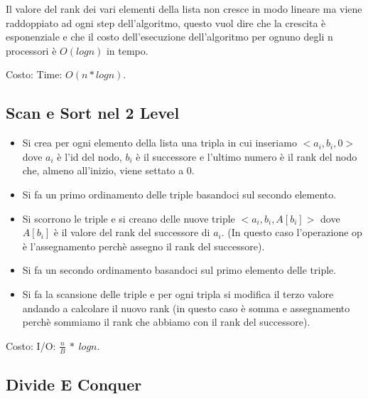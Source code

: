 \documentclass[12pt]{article}
\begin{document}
Il valore del rank dei vari elementi della lista non cresce in modo lineare ma viene raddoppiato ad ogni step dell'algoritmo, questo vuol dire che la crescita è esponenziale e che il costo dell'esecuzione dell'algoritmo per ognuno degli n processori è $O(logn)$ in tempo. 

Costo: Time: $O(n*logn)$.

\subsection{Scan e Sort nel 2 Level}

\begin{itemize}
    \item Si crea per ogni elemento della lista una tripla in cui inseriamo $<a_i, b_i, 0>$ dove $a_i$ è l'id del nodo, $b_i$ è il successore e l'ultimo numero è il rank del nodo che, almeno all'inizio, viene settato a 0.
    \item Si fa un primo ordinamento delle triple basandoci sul secondo elemento.
    \item Si scorrono le triple e si creano delle nuove triple $<a_i, b_i, A[b_i]>$ dove $A[b_i]$ è il valore del rank del successore di $a_i$. (In questo caso l'operazione op è l'assegnamento perchè assegno il rank del successore).
    \item Si fa un secondo ordinamento basandoci sul primo elemento delle triple.
    \item Si fa la scansione delle triple e per ogni tripla si modifica il terzo valore andando a calcolare il nuovo rank (in questo caso è somma e assegnamento perchè sommiamo il rank che abbiamo con il rank del successore).
\end{itemize}

Costo: I/O:  $\frac{n}{B}\ *\ logn $.

\subsection{Divide E Conquer}
\end{document}
